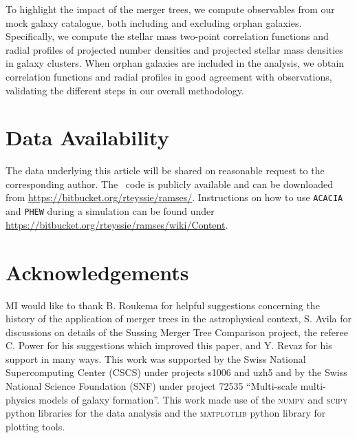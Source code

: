 To highlight  the impact of  the merger trees, we  compute observables
from our  mock galaxy catalogue,  both including and  excluding orphan
galaxies.  Specifically,   we  compute  the  stellar   mass  two-point
correlation  functions   and  radial  profiles  of   projected  number
densities and projected stellar mass densities in galaxy clusters. When orphan
galaxies are included in the analysis, we obtain correlation functions
and radial  profiles in  good agreement with  observations, validating
the different steps in our overall methodology.



\section*{Data Availability}

The data underlying this article will be shared on reasonable request 
to the corresponding author. The \ramses\  code is  publicly available 
and  can be  downloaded from \url{https://bitbucket.org/rteyssie/ramses/}. 
Instructions  on how to use \texttt{ACACIA} and \texttt{PHEW} during a 
simulation can be found under 
\url{https://bitbucket.org/rteyssie/ramses/wiki/Content}. 


\section*{Acknowledgements}

MI would like  to thank B. Roukema for  helpful suggestions concerning
the history  of the application  of merger trees in  the astrophysical
context, S.   Avila for discussions  on details of the  Sussing Merger
Tree Comparison  project, the referee C. Power for his suggestions 
which improved this paper, and Y. Revaz for  his support in many  ways.  
This  work  was supported  by the  Swiss
National Supercomputing  Center (CSCS)  under projects s1006  and uzh5
and  by the  Swiss  National Science  Foundation  (SNF) under  project
72535 ``Multi-scale multi-physics models of galaxy formation''.  This
work        made        use        of        the        \textsc{numpy}
\citep{harrisArrayProgrammingNumPy2020}       and       \textsc{scipy}
\citep{virtanenSciPyFundamentalAlgorithms2020}  python  libraries  for
the      data      analysis      and      the      \textsc{matplotlib}
\citep{hunterMatplotlib2DGraphics2007}  python  library  for  plotting
tools.

